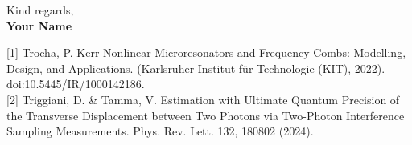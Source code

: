\documentclass[11pt]{report}
\begin{document}
\begin{titlepage}
\lipsum[1]

\vspace{0.7em}


\lipsum[1]

\vspace{0.7em}


\lipsum[1]

\vspace{0.7em}


\lipsum[1]

\vspace{0.7em}



\begin{minipage}[t]{0.17\textwidth}
    \raggedright Kind regards,\\
    \textbf{Your Name}
\end{minipage}
\hfill

\begin{minipage}[t]{0.8\textwidth}

    \tiny{[1] Trocha, P. Kerr-Nonlinear Microresonators and Frequency Combs: Modelling, Design, and Applications. (Karlsruher Institut für Technologie (KIT), 2022). doi:10.5445/IR/1000142186.}\\
    \tiny{[2] Triggiani, D. \& Tamma, V. Estimation with Ultimate Quantum Precision of the Transverse Displacement between Two Photons via Two-Photon Interference Sampling Measurements. Phys. Rev. Lett. 132, 180802 (2024).}

\end{minipage}



\end{titlepage}
\end{document}
